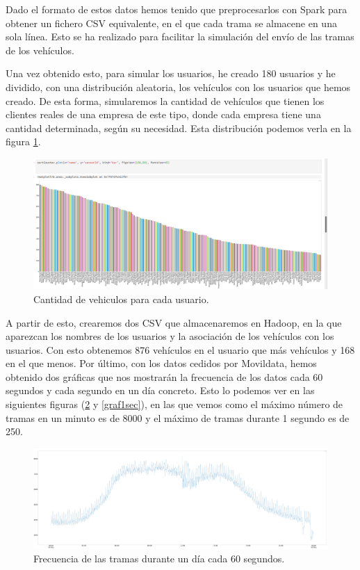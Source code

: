 Dado el formato de estos datos hemos tenido que preprocesarlos con Spark
para obtener un fichero CSV equivalente, en el que cada trama se almacene
en una sola línea. Esto se ha realizado para facilitar la simulación del
envío de las tramas de los vehículos.

Una vez obtenido esto, para simular los usuarios, he creado 180 usuarios y
he dividido, con una distribución aleatoria, los vehículos con los usuarios
que hemos creado. De esta forma, simularemos la cantidad de vehículos que
tienen los clientes reales de una empresa de este tipo, donde cada empresa
tiene una cantidad determinada, según su necesidad. Esta distribución
podemos verla en la figura \ref{userGraf}.

\begin{figure}[htp]
\centering
\includegraphics[scale=0.3]{Imagenes/graf1.png}
\caption{Cantidad de vehiculos para cada usuario.}
\label{userGraf}
\end{figure}

A partir de esto, crearemos dos CSV que almacenaremos en Hadoop, en la que
aparezcan los nombres de los usuarios y la asociación de los vehículos con
los usuarios. Con esto obtenemos 876 vehículos en el usuario que más
vehículos y 168 en el que menos. Por último, con los datos cedidos por
Movildata, hemos obtenido dos gráficas que nos mostrarán la frecuencia de
los datos cada 60 segundos y cada segundo en un día concreto. Esto lo
podemos ver en las siguientes figuras (\ref{graf60sec} y \ref{graf1sec}),
en las que vemos como el máximo número de tramas en un minuto es de 8000 y
el máximo de tramas durante 1 segundo es de 250.

\begin{figure}[htp]
\centering
\includegraphics[scale=0.26]{Imagenes/graf2.png}
\caption{Frecuencia de las tramas durante un día cada 60 segundos.}
\label{graf60sec}
\end{figure}

